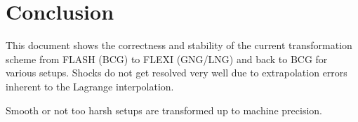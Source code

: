 \section{Conclusion}

This document shows the correctness and stability of the current transformation
scheme from FLASH (BCG) to FLEXI (GNG/LNG) and back to BCG for various setups.
Shocks do not get resolved very well due to extrapolation errors inherent to
the Lagrange interpolation.

Smooth or not too harsh setups are transformed up to machine precision.

